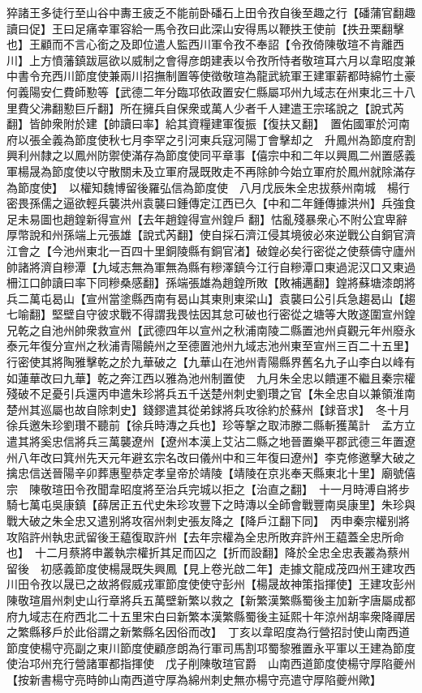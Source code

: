 猝諸王多徒行至山谷中夀王疲乏不能前卧磻石上田令孜自後至趣之行【磻蒲官翻趣讀曰促】王曰足痛幸軍容給一馬令孜曰此深山安得馬以鞭抶王使前【抶丑栗翻擊也】王顧而不言心銜之及即位遣人監西川軍令孜不奉詔【令孜倚陳敬瑄不肯離西川】上方憤藩鎮跋扈欲以威制之會得彦朗建表以令孜所恃者敬瑄耳六月以韋昭度兼中書令充西川節度使兼兩川招撫制置等使徵敬瑄為龍武統軍王建軍薪都時綿竹土豪何義陽安仁費師懃等【武德二年分臨邛依政置安仁縣屬邛州九域志在州東北三十八里費父沸翻懃巨斤翻】所在擁兵自保衆或萬人少者千人建遣王宗瑤說之【說式芮翻】皆帥衆附於建【帥讀曰率】給其資糧建軍復振【復扶又翻】　置佑國軍於河南府以張全義為節度使秋七月李罕之引河東兵寇河陽丁會擊却之　升鳳州為節度府割興利州隸之以鳳州防禦使滿存為節度使同平章事【僖宗中和二年以興鳳二州置感義軍楊晟為節度使以守散關未及立軍府晟既敗走不再除帥今始立軍府於鳳州就除滿存為節度使】　以權知魏博留後羅弘信為節度使　八月戊辰朱全忠拔蔡州南城　楊行密畏孫儒之逼欲輕兵襲洪州袁襲曰鍾傳定江西已久【中和二年鍾傳據洪州】兵強食足未易圖也趙鍠新得宣州【去年趙鍠得宣州鍠戶翻】怙亂殘暴衆心不附公宜卑辭厚幣說和州孫端上元張雄【說式芮翻】使自採石濟江侵其境彼必來逆戰公自銅官濟江會之【今池州東北一百四十里銅陵縣有銅官渚】破鍠必矣行密從之使蔡儔守廬州帥諸將濟自糝潭【九域志無為軍無為縣有糝澤鎮今江行自糝潭口東過泥汉口又東過柵江口帥讀曰率下同糝桑感翻】孫端張雄為趙鍠所敗【敗補邁翻】鍠將蘇塘漆朗將兵二萬屯曷山【宣州當塗縣西南有曷山其東則東梁山】袁襲曰公引兵急趨曷山【趨七喻翻】堅壁自守彼求戰不得謂我畏怯因其怠可破也行密從之塘等大敗遂圍宣州鍠兄乾之自池州帥衆救宣州【武德四年以宣州之秋浦南陵二縣置池州貞觀元年州廢永泰元年復分宣州之秋浦青陽饒州之至德置池州九域志池州東至宣州三百二十五里】行密使其將陶雅擊乾之於九華破之【九華山在池州青陽縣界舊名九子山李白以峰有如蓮華改曰九華】乾之奔江西以雅為池州制置使　九月朱全忠以饋運不繼且秦宗權殘破不足憂引兵還丙申遣朱珍將兵五千送楚州刺史劉瓚之官【朱全忠自以兼領淮南楚州其巡屬也故自除刺史】錢鏐遣其從弟銶將兵攻徐約於蘇州【銶音求】　冬十月徐兵邀朱珍劉瓚不聽前【徐兵時漙之兵也】珍等撃之取沛滕二縣斬獲萬計　孟方立遣其將奚忠信將兵三萬襲遼州【遼州本漢上艾沾二縣之地晉置樂平郡武德三年置遼州八年改曰箕州先天元年避玄宗名改曰儀州中和三年復曰遼州】李克修邀擊大破之擒忠信送晉陽辛卯葬惠聖恭定孝皇帝於靖陵【靖陵在京兆奉天縣東北十里】廟號僖宗　陳敬瑄田令孜聞韋昭度將至治兵完城以拒之【治直之翻】　十一月時溥自將步騎七萬屯吳康鎮【薛居正五代史朱珍攻豐下之時漙以全師會戰豐南吳康里】朱珍與戰大破之朱全忠又遣别將攻宿州刺史張友降之【降戶江翻下同】　丙申秦宗權别將攻陷許州執忠武留後王藴復取許州【去年宗權為全忠所敗弃許州王藴蓋全忠所命也】　十二月蔡將申叢執宗權折其足而囚之【折而設翻】降於全忠全忠表叢為蔡州留後　初感義節度使楊晟既失興鳳【見上卷光啟二年】走據文龍成茂四州王建攻西川田令孜以晟已之故將假威戎軍節度使使守彭州【楊晟故神策指揮使】王建攻彭州陳敬瑄眉州刺史山行章將兵五萬壁新繁以救之【新繁漢繁縣蜀後主加新字唐屬成都府九域志在府西北二十五里宋白曰新繁本漢繁縣蜀後主延熙十年涼州胡率衆降禪居之繁縣移戶於此俗謂之新繁縣名因俗而改】　丁亥以韋昭度為行營招討使山南西道節度使楊守亮副之東川節度使顧彦朗為行軍司馬割邛蜀黎雅置永平軍以王建為節度使治邛州充行營諸軍都指揮使　戊子削陳敬瑄官爵　山南西道節度使楊守厚陷夔州【按新書楊守亮時帥山南西道守厚為綿州刺史無亦楊守亮遣守厚陷夔州歟】


